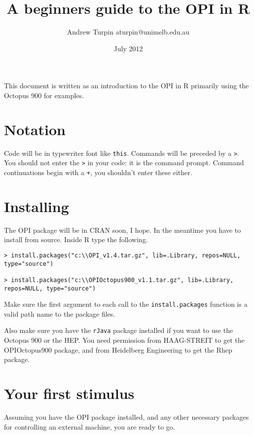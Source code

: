 \documentclass{article}
\title{A beginners guide to the OPI in R}
\date{July 2012}
\author{Andrew Turpin aturpin@unimelb.edu.au}
\begin{document}
\maketitle

This document is written as an introduction to the OPI in R primarily
using the Octopus 900 for examples.

\section{Notation}

Code will be in typewriter font like {\tt this}.
Commands will be preceded by a {\tt >}. You should not enter the {\tt >} in your code: it is
the command prompt. Command continuations begin with a {\tt +}, you shouldn't enter these
either.

\section{Installing}
\label{sec-install}

The OPI package will be in CRAN soon, I hope. In the meantime you have to install from source.
Inside R type the following.

\begin{verbatim}
> install.packages("c:\\OPI_v1.4.tar.gz", lib=.Library, repos=NULL, type="source")

> install.packages("c:\\OPIOctopus900_v1.1.tar.gz", lib=.Library, repos=NULL, type="source")
\end{verbatim}

Make sure the first argument to each call to the {\tt install.packages}
function is a valid path name to the package files.

Also make sure you have the {\tt rJava} package installed if you
want to use the Octopus 900 or the HEP. You need permission from
HAAG-STREIT to get the OPIOctopus900 package, and from Heidelberg
Engineering to get the Rhep package.




\section{Your first stimulus}

Assuming you have the OPI package installed, and any other necessary
packages for controlling an external machine, you are ready to go.
\end{document}
